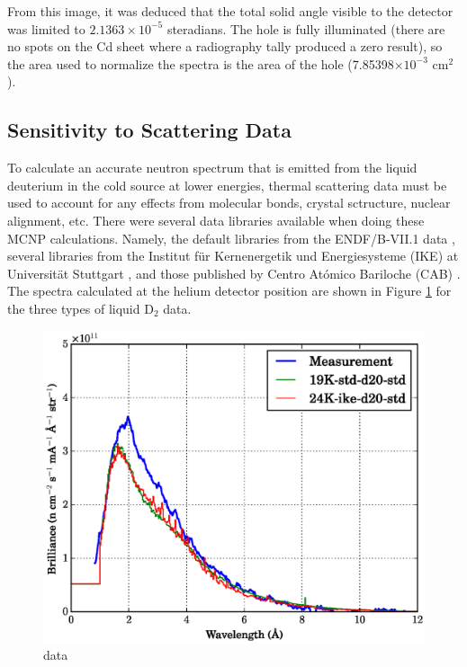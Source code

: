 \documentclass[preprint,12pt]{elsarticle}
\begin{document}
From this image, it was deduced that the total solid angle visible to the detector was limited to $2.1363\times10^{-5}$ steradians.  The hole is fully illuminated (there are no spots on the Cd sheet where a radiography tally produced a zero result), so the area used to normalize the spectra is the area of the hole (7.85398$\times 10^{-3}$ cm$^2$).


%
%
%
%
%



\subsection{Sensitivity to Scattering Data}
\label{subsec:data}

To calculate an accurate neutron spectrum that is emitted from the liquid deuterium in the cold source at lower energies, thermal scattering data must be used to account for any effects from molecular bonds, crystal sctructure, nuclear alignment, etc.  There were several data libraries available when doing these MCNP calculations.  Namely, the default libraries from the ENDF/B-VII.1 data \cite{endf_d2}, several libraries from the Institut f\"{u}r Kernenergetik und Energiesysteme (IKE) at Universit\"{a}t Stuttgart \cite{IKE}, and those published by Centro At\'{o}mico Bariloche (CAB) \cite{granada_d2}.  The spectra calculated at the helium detector position are shown in Figure \ref{fig:data_compare_d2} for the three types of liquid D$_2$ data.

\begin{figure}[h!] 
  \centering
    \includegraphics[width=\columnwidth]{graphics/data_compare_d2.eps}
     \caption{data   \label{fig:data_compare_d2}}
\end{figure}
\end{document}
